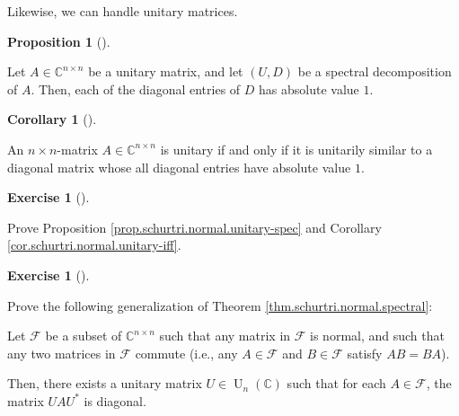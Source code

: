 \documentclass[numbers=enddot,12pt,final,onecolumn,notitlepage]{scrartcl}%
\newcounter{exer}
\numberwithin{exer}{subsection}
\theoremstyle{definition}
\newtheorem{prop}[theo]{Proposition}
\newenvironment{proposition}[1][]
{\begin{prop}[#1]\begin{leftbar}}
{\end{leftbar}\end{prop}}
\newtheorem{coro}[theo]{Corollary}
\newenvironment{corollary}[1][]
{\begin{coro}[#1]\begin{leftbar}}
{\end{leftbar}\end{coro}}
\newtheorem{exmp}[exer]{Exercise}
\newenvironment{exercise}[1][]
{\begin{exmp}[#1]\begin{leftbar}}
{\end{leftbar}\end{exmp}}
\begin{document}
Likewise, we can handle unitary matrices.

\begin{proposition}
\label{prop.schurtri.normal.unitary-spec}Let $A\in\mathbb{C}^{n\times n}$ be a
unitary matrix, and let $\left(  U,D\right)  $ be a spectral decomposition of
$A$. Then, each of the diagonal entries of $D$ has absolute value $1$.
\end{proposition}

\begin{corollary}
\label{cor.schurtri.normal.unitary-iff}An $n\times n$-matrix $A\in
\mathbb{C}^{n\times n}$ is unitary if and only if it is unitarily similar to a
diagonal matrix whose all diagonal entries have absolute value $1$.
\end{corollary}

\begin{exercise}
\label{exe.schurtri.normal.unitary} Prove Proposition
\ref{prop.schurtri.normal.unitary-spec} and Corollary
\ref{cor.schurtri.normal.unitary-iff}.
\end{exercise}

\begin{exercise}
 Prove the following generalization of Theorem
\ref{thm.schurtri.normal.spectral}:

Let $\mathcal{F}$ be a subset of $\mathbb{C}^{n\times n}$ such that any matrix
in $\mathcal{F}$ is normal, and such that any two matrices in $\mathcal{F}$
commute (i.e., any $A\in\mathcal{F}$ and $B\in\mathcal{F}$ satisfy $AB=BA$).

Then, there exists a unitary matrix $U\in\operatorname*{U}\nolimits_{n}\left(
\mathbb{C}\right)  $ such that for each $A\in\mathcal{F}$, the matrix
$UAU^{\ast}$ is diagonal.
\end{exercise}

\newpage
\end{document}
